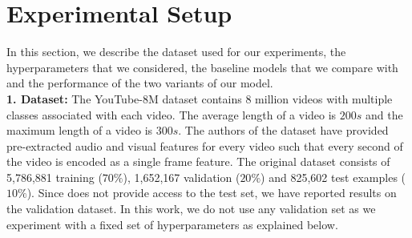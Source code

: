 \documentclass[10pt,twocolumn,letterpaper]{article}
\newcommand{\Model}{\textsc{TeaStud}\xspace}
\begin{document}
\begin{table*}

\end{table*}

\section{Experimental Setup}
In this section, we describe the dataset used for our experiments, the hyperparameters that we considered, the baseline models that we compare with and the performance of the two variants of our model.\\

\noindent \textbf{1. Dataset:}
The YouTube-8M dataset \cite{Youtube8M} contains 8
million videos with multiple classes associated with each video. The average length of a video is $200s$ and the maximum length of a video is $300s$. The authors of the dataset have provided pre-extracted audio and visual features for every video such that every second of the video is encoded as a single frame feature. The original dataset consists of 5,786,881 training ($70\%$), 1,652,167 validation ($20\%$) and 825,602 test examples ($10\%$). Since \cite{Youtube8M} does not provide access to the test set, we have reported results on the validation dataset. In this work, we do not use any validation set as we experiment with a fixed set of hyperparameters as explained below.\\
\end{document}
